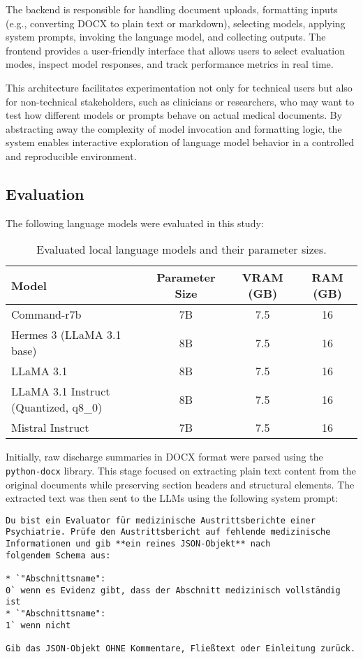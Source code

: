 The backend is responsible for handling document uploads, formatting inputs (e.g., converting DOCX to plain text or markdown), selecting models, applying system prompts, invoking the language model, and collecting outputs. The frontend provides a user-friendly interface that allows users to select evaluation modes, inspect model responses, and track performance metrics in real time.

This architecture facilitates experimentation not only for technical users but also for non-technical stakeholders, such as clinicians or researchers, who may want to test how different models or prompts behave on actual medical documents. By abstracting away the complexity of model invocation and formatting logic, the system enables interactive exploration of language model behavior in a controlled and reproducible environment.

\subsection{Evaluation}
The following language models were evaluated in this study:

\begin{table}[H]
\centering
\begin{tabular}{l c c c}
\toprule
    \textbf{Model} & \textbf{Parameter Size} & \textbf{VRAM (GB)} & \textbf{RAM (GB)} \\
\midrule
    Command-r7b & 7B & 7.5 & 16 \\
    Hermes 3 (LLaMA 3.1 base) & 8B & 7.5 &16 \\
    LLaMA 3.1 & 8B & 7.5 & 16 \\
    LLaMA 3.1 Instruct (Quantized, q8\_0) & 8B & 7.5 & 16  \\
    Mistral Instruct & 7B & 7.5 & 16 \\
\bottomrule
\end{tabular}
\caption{Evaluated local language models and their parameter sizes.}
\label{tab:llm_models}
\end{table}

Initially, raw discharge summaries in DOCX format were parsed 
using the \texttt{python-docx} library. This stage focused on extracting 
plain text content from the original documents while preserving section 
headers and structural elements. The extracted text was then sent to the LLMs
using the following system prompt:
\begin{promptbox}
\begin{verbatim}
Du bist ein Evaluator für medizinische Austrittsberichte einer 
Psychiatrie. Prüfe den Austrittsbericht auf fehlende medizinische 
Informationen und gib **ein reines JSON-Objekt** nach 
folgendem Schema aus:

* `"Abschnittsname": 
0` wenn es Evidenz gibt, dass der Abschnitt medizinisch vollständig ist
* `"Abschnittsname": 
1` wenn nicht

Gib das JSON-Objekt OHNE Kommentare, Fließtext oder Einleitung zurück.
\end{verbatim}
\end{promptbox}

